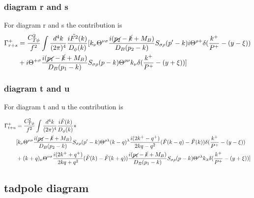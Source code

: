 \documentclass[preprintnumbers,prd,superscriptaddress,preprint]{revtex4-1}
\begin{document}
	
	\subsubsection{diagram r and s }
	
	For diagram r and s the contribution is 
	\begin{align*}
		\Gamma_{r+s}^{+} & =\frac{C_{T\phi}^{2}}{f^{2}}\int\frac{d^{4}k}{(2\pi)^{4}}\frac{i\tilde{F^{2}}(k)}{D_{\phi}(k)}[k_{\nu}\Theta^{\nu\sigma}\frac{i(\cancel{p_{2}}-\cancel{k}+M_{B})}{D_{B}(p_{2}-k)}S_{\sigma\rho}(p'-k)i\Theta^{\rho+}\delta(\frac{k^{+}}{P^{+}}-(y-\xi))\\
		& +i\Theta^{+\sigma}\frac{i(\cancel{p_{1}}-\cancel{k}+M_{B})}{D_{B}(p_{1}-k)}S_{\sigma\rho}(p-k)\Theta^{\rho\nu}k_{\nu}\delta(\frac{k^{+}}{P^{+}}-(y+\xi))]    
	\end{align*}
	
	
	\subsubsection{diagram t and u}
	
	For diagram t and u the contribution is 
	
	\begin{align*}
		\Gamma_{t+u}^{+} & =\frac{C_{T\phi}^{2}}{f^{2}}\int\frac{d^{4}k}{(2\pi)^{4}}\frac{i\tilde{F}(k)}{D_{\phi}(k)}*\\
		&[k_{\nu}\Theta^{\nu\sigma}\frac{i(\cancel{p_{2}}-\cancel{k}+M_{B})}{D_{B}(p_{2}-k)}S_{\sigma\rho}(p'-k)\Theta^{\rho\lambda}(k-q)^{\lambda}\frac{i(2k^{+}-q^{+})}{2kq-q^{2}}(\tilde{F}(k-q)-\tilde{F}(k))\delta(\frac{k^{+}}{P^{+}}-(y-\xi))\\
		& +(k+q)_{\nu}\Theta^{\nu\sigma}\frac{i(2k^{+}+q^{+})}{2kq+q^{2}}(\tilde{F}(k)-\tilde{F}(k+q))\frac{i(\cancel{p_{1}}-\cancel{k}+M_{B})}{D_{B}(p_{1}-k)}S_{\sigma\rho}(p-k)\Theta^{\rho\lambda}k_{\lambda}\delta(\frac{k^{+}}{P^{+}}-(y+\xi))]
	\end{align*}
	
	
	\subsection{tadpole diagram}
	
\end{document}
